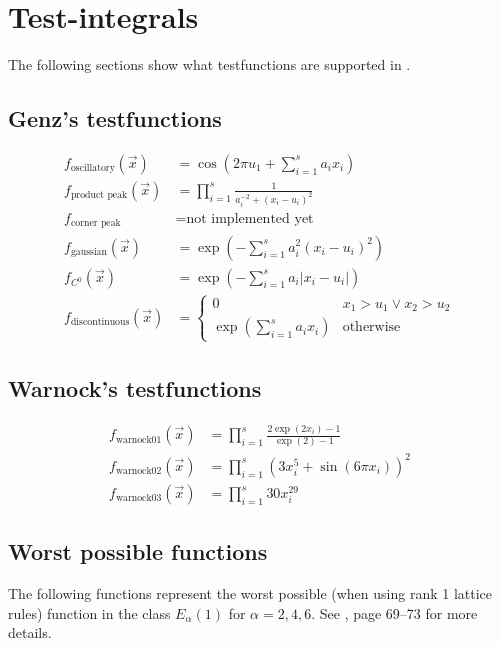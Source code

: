 \chapter{Test-integrals}

The following sections show what testfunctions are supported in \qmcpack.

\section{Genz's testfunctions}

\begin{align}
f_{\text{oscillatory}}(\vec{x}) &=  \cos \left( 2\pi u_1 + \sum_{i=1}^{s}
a_ix_i\right) \\
f_{\text{product peak}}(\vec{x}) &= \prod_{i=1}^{s} \frac{1}{a_i^{-2}+(x_i -
u_i)^2} \\
f_{\text{corner peak}} &= \text{not implemented yet} \\
f_{\text{gaussian}}(\vec{x}) &= \exp \left( - \sum_{i=1}^{s} a_i^2(x_i-u_i)^2
\right) \\
f_\text{$C^0$}(\vec{x}) &= \exp \left(-\sum_{i=1}^s{a_i|x_i-u_i|} \right) \\
f_{\text{discontinuous}}(\vec{x}) &=
\begin{cases}
0 & x_1 > u_1 \vee x_2 > u_2 \\
\exp \left( \sum_{i=1}^{s} a_ix_i \right) & \text{otherwise}
\end{cases}
\end{align}

\section{Warnock's testfunctions}

\begin{align}
f_\text{warnock01}(\vec{x}) &= \prod_{i=1}^s \frac{2\exp(2x_i)-1}{\exp(2)-1} \\
f_\text{warnock02}(\vec{x}) &= \prod_{i=1}^s \left( 3x_i^5 + \sin(6\pi x_i)
\right)^2 \\
f_\text{warnock03}(\vec{x}) &= \prod_{i=1}^s 30x_i^{29}
\end{align}


\section{Worst possible functions}

The following functions represent the worst possible (when using rank 1
lattice rules) function in the class $E_{\alpha}(1)$ for $\alpha=2, 4, 6$.
See \cite{sloan94joe}, page 69--73 for more details.

